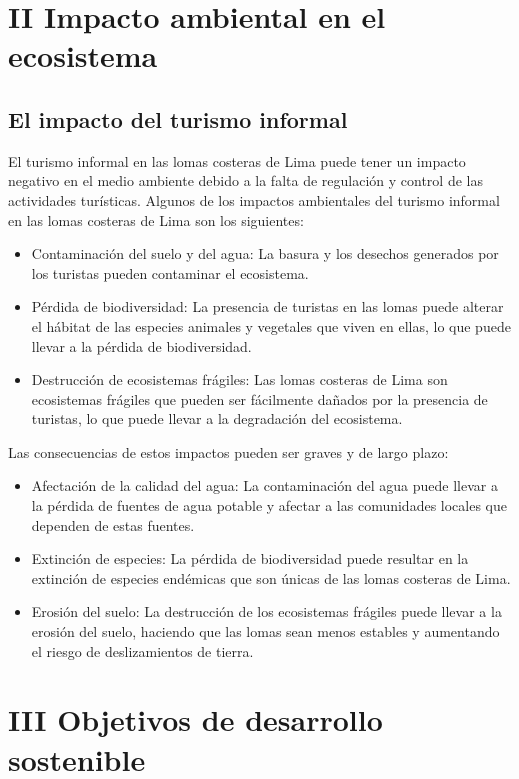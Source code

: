 \documentclass[a4paper,11pt]{article}
\begin{document}
\section{II Impacto ambiental en el ecosistema}
\subsection{El impacto del turismo informal}
El turismo informal en las lomas costeras de Lima puede tener un impacto negativo en el medio ambiente debido a la falta de regulación y control de las actividades turísticas. Algunos de los impactos ambientales del turismo informal en las lomas costeras de Lima son los siguientes:
\begin{itemize}
\item Contaminación del suelo y del agua: La basura y los desechos generados por los turistas pueden contaminar el ecosistema.
\item Pérdida de biodiversidad: La presencia de turistas en las lomas puede alterar el hábitat de las especies animales y vegetales que viven en ellas, lo que puede llevar a la pérdida de biodiversidad.
\item Destrucción de ecosistemas frágiles: Las lomas costeras de Lima son ecosistemas frágiles que pueden ser fácilmente dañados por la presencia de turistas, lo que puede llevar a la degradación del ecosistema.
\end{itemize}

Las consecuencias de estos impactos pueden ser graves y de largo plazo:
\begin{itemize}
\item Afectación de la calidad del agua: La contaminación del agua puede llevar a la pérdida de fuentes de agua potable y afectar a las comunidades locales que dependen de estas fuentes.
\item Extinción de especies: La pérdida de biodiversidad puede resultar en la extinción de especies endémicas que son únicas de las lomas costeras de Lima.
\item Erosión del suelo: La destrucción de los ecosistemas frágiles puede llevar a la erosión del suelo, haciendo que las lomas sean menos estables y aumentando el riesgo de deslizamientos de tierra.
\end{itemize}



\section{III Objetivos de desarrollo sostenible}
\end{document}
